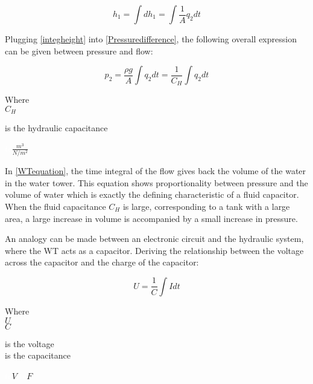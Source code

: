 \begin{equation}
 h_1 = \int dh_1 = \int \frac{1}{A} q_2 dt
  \label{integheight}
\end{equation}

Plugging \eqref{integheight} into \eqref{Pressuredifference}, the following overall expression can be given between pressure and flow: 

\begin{equation}
\label{WTequation}
  p_2 =  \frac{\rho g}{A}  \int   q_2 dt = \frac{1}{C_H} \int   q_2 dt
\end{equation}

\begin{minipage}[t]{0.20\textwidth}
Where\\
\hspace*{8mm} $C_H$ 
\end{minipage}
\begin{minipage}[t]{0.68\textwidth}
\vspace*{2mm}
is the hydraulic capacitance
\end{minipage}
\begin{minipage}[t]{0.10\textwidth}
\vspace*{2mm}
\textcolor{White}{te}$\unit{\frac{m^3}{N/m^2}}$
\end{minipage}

In \eqref{WTequation}, the time integral of the flow gives back the volume of the water in the water tower. This equation shows proportionality between pressure and the volume of water which is exactly the defining characteristic of a fluid capacitor. When the fluid capacitance $C_H$ is large, corresponding to a tank with a large area, a large increase in volume is accompanied by a small increase in pressure. 

An analogy can be made between an electronic circuit and the hydraulic system, where the WT acts as a capacitor.  Deriving the relationship between the voltage across the capacitor and the 
charge of the capacitor:

\begin{equation}
  U = \frac{1}{C} \int I dt
  \label{ElecCircuirt}
\end{equation}

\begin{minipage}[t]{0.20\textwidth}
Where\\
\hspace*{8mm} $U$ \\
\hspace*{8mm} $C$ 
\end{minipage}
\begin{minipage}[t]{0.68\textwidth}
\vspace*{2mm}
is the voltage\\
is the capacitance 
\end{minipage}
\begin{minipage}[t]{0.10\textwidth}
\vspace*{2mm}
\textcolor{White}{te}$\unit{V}$
\textcolor{White}{te}$\unit{F}$
\end{minipage}

